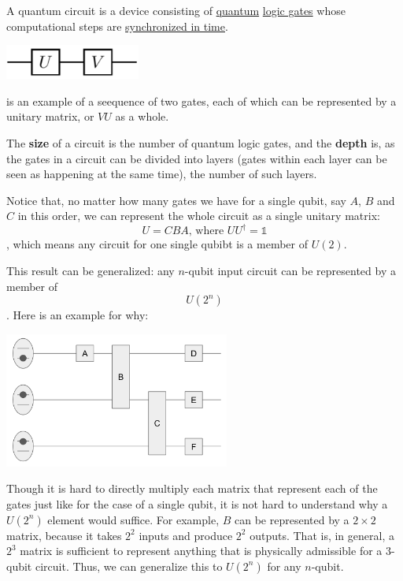 \documentclass[12pt]{article}
\begin{document}
\begin{definition}
A quantum circuit is a device consisting of \underline{quantum} \underline{logic gates} whose computational steps are \underline{synchronized in time}.
\begin{center}
\includegraphics[width = 12em]{images/3.jpg}
\end{center}
is an example of a seequence of two gates, each of which can be represented by a unitary matrix, or $VU$ as a whole.
\end{definition}

\begin{definition}
The \textbf{size} of a circuit is the number of quantum logic gates, and the \textbf{depth} is, as the gates in a circuit can be divided into layers (gates within each layer can be seen as happening at the same time), the number of such layers.
\end{definition}

\begin{proposition}
Notice that, no matter how many gates we have for a single qubit, say $A$, $B$ and $C$ in this order, we can represent the whole circuit as a single unitary matrix: $$
U = CBA\text{, where } UU^\dag = \mathbb{1}
$$, which means any circuit for one single qubibt is a member of $U(2)$.

This result can be generalized: any $n$-qubit input circuit can be represented by a member of $$\boxed{U(2^n)}$$. Here is an example for why:
\begin{center}
\includegraphics[width = 20em]{images/4.jpg}
\end{center}
Though it is hard to directly multiply each matrix that represent each of the gates just like for the case of a single qubit, it is not hard to understand why a $U(2^n)$ element would suffice. For example, $B$ can be represented by a $2\times 2$ matrix, because it takes $2^2$ inputs and produce $2^2$ outputs. That is, in general, a $2^3$ matrix is sufficient to represent anything that is physically admissible for a $3$-qubit circuit. Thus, we can generalize this to $U(2^n)$ for any $n$-qubit.
\end{proposition}
\end{document}
